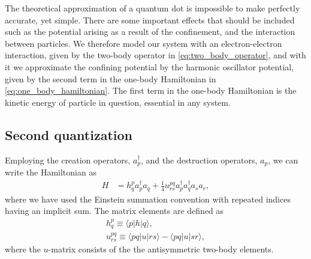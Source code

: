 \documentclass[
    a4paper, aps, twocolumn, floatfix, superscriptaddress,
    nofootinbib]{revtex4-1}
\newcommand{\1}{\mathds{1}}
\newcommand{\bra}[1]{\langle #1\lvert}
\newcommand{\ket}[1]{\rvert #1\rangle}
\newcommand{\acr}[1]{a_{#1}^{\dagger}}
\newcommand{\ade}[1]{a_{#1}}
\begin{document}
        The theoretical approximation of a quantum dot is impossible to make
        perfectly accurate, yet simple. There are some important effects that
        should be included such as the potential arising as a result of the
        confinement, and the interaction between particles. We therefore model
        our system with an electron-electron interaction, given by the two-body
        operator in \autoref{eq:two_body_operator}, and with it we approximate
        the confining potential by the harmonic oscillator potential, given by
        the second term in the one-body Hamiltonian in
        \autoref{eq:one_body_hamiltonian}. The first term in the one-body
        Hamiltonian is the kinetic energy of particle in question, essential in
        any system.

    \subsection{Second quantization}
        Employing the creation operators, $\acr{p}$, and the destruction
        operators, $\ade{p}$, we can write the Hamiltonian as
        \begin{align}
            H
            &=
            h_{q}^{p}\acr{p}\ade{q}
            + \frac{1}{4}u^{pq}_{rs}
            \acr{p}\acr{q}\ade{s}\ade{r},
        \end{align}
        where we have used the Einstein summation convention with repeated
        indices having an implicit sum. The matrix elements are defined as
        \begin{gather}
            h^{p}_{q} \equiv \bra{p}h\ket{q}, \\
            u^{pq}_{rs} \equiv \bra{pq}u\ket{rs} - \bra{pq}u\ket{sr},
        \end{gather}
        where the $u$-matrix consists of the the antisymmetric two-body
        elements.
\end{document}

